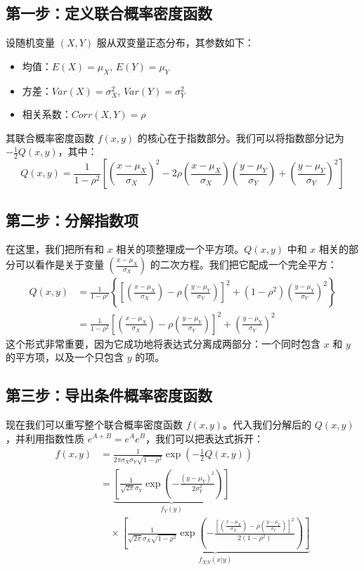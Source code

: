 \documentclass[UTF8]{ctexart}
\begin{document}
\subsection*{第一步：定义联合概率密度函数 }

设随机变量 $(X, Y)$ 服从双变量正态分布，其参数如下：
\begin{itemize}
    \item 均值：$E(X) = \mu_X$, $E(Y) = \mu_Y$
    \item 方差：$Var(X) = \sigma_X^2$, $Var(Y) = \sigma_Y^2$
    \item 相关系数：$Corr(X, Y) = \rho$
\end{itemize}

其联合概率密度函数 $f(x, y)$ 的核心在于指数部分。我们可以将指数部分记为 $-\frac{1}{2}Q(x,y)$，其中：
$$
Q(x,y) = \frac{1}{1-\rho^2} \left[ \left(\frac{x-\mu_X}{\sigma_X}\right)^2 - 2\rho\left(\frac{x-\mu_X}{\sigma_X}\right)\left(\frac{y-\mu_Y}{\sigma_Y}\right) + \left(\frac{y-\mu_Y}{\sigma_Y}\right)^2 \right]
$$

\subsection*{第二步：分解指数项}

在这里，我们把所有和 $x$ 相关的项整理成一个平方项。$Q(x, y)$ 中和 $x$ 相关的部分可以看作是关于变量 $(\frac{x-\mu_X}{\sigma_X})$ 的二次方程。我们把它配成一个完全平方：
\begin{align*}
Q(x,y) &= \frac{1}{1-\rho^2} \left\{ \left[ \left(\frac{x-\mu_X}{\sigma_X}\right) - \rho\left(\frac{y-\mu_Y}{\sigma_Y}\right) \right]^2 + (1-\rho^2)\left(\frac{y-\mu_Y}{\sigma_Y}\right)^2 \right\} \\
&= \frac{1}{1-\rho^2} \left[ \left(\frac{x-\mu_X}{\sigma_X}\right) - \rho\left(\frac{y-\mu_Y}{\sigma_Y}\right) \right]^2 + \left(\frac{y-\mu_Y}{\sigma_Y}\right)^2
\end{align*}
这个形式非常重要，因为它成功地将表达式分离成两部分：一个同时包含 $x$ 和 $y$ 的平方项，以及一个只包含 $y$ 的项。

\subsection*{第三步：导出条件概率密度函数}

现在我们可以重写整个联合概率密度函数 $f(x,y)$。代入我们分解后的 $Q(x,y)$，并利用指数性质 $e^{A+B} = e^A e^B$，我们可以把表达式拆开：
\begin{align*}
f(x,y) &= \frac{1}{2\pi\sigma_X\sigma_Y\sqrt{1-\rho^2}} \exp\left(-\frac{1}{2}Q(x,y)\right) \\
&= \underbrace{\left[ \frac{1}{\sqrt{2\pi}\sigma_Y} \exp\left( -\frac{(y-\mu_Y)^2}{2\sigma_Y^2} \right) \right]}_{f_Y(y)} \\
& \quad \times \underbrace{\left[ \frac{1}{\sqrt{2\pi}\sigma_X\sqrt{1-\rho^2}} \exp\left( -\frac{\left[ \left(\frac{x-\mu_X}{\sigma_X}\right) - \rho\left(\frac{y-\mu_Y}{\sigma_Y}\right) \right]^2}{2(1-\rho^2)} \right) \right]}_{f_{X|Y}(x|y)}
\end{align*}
\end{document}
